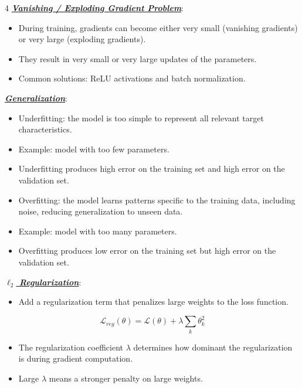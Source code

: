 \documentclass[12pt]{article}
\newcommand{\bulletPoint}[1]{\ul{\textit{\textbf{#1}}}}
\begin{document}
\begin{multicols*}{4}
\bulletPoint{Vanishing / Exploding Gradient Problem}:
\begin{itemize}
\item During training, gradients can become either very small (vanishing gradients) or very large (exploding gradients).
\item They result in very small or very large updates of the parameters.
\item Common solutions: ReLU activations and batch normalization.
\end{itemize}

\bulletPoint{Generalization}:
\begin{itemize}
\item Underfitting: the model is too simple to represent all relevant target characteristics.
\item Example: model with too few parameters.
\item Underfitting produces high error on the training set and high error on the validation set.
\item Overfitting: the model learns patterns specific to the training data, including noise, reducing generalization to unseen data.
\item Example: model with too many parameters.
\item Overfitting produces low error on the training set but high error on the validation set.
\end{itemize}

\bulletPoint{$\ell_2$ Regularization}:
\begin{itemize}
\item Add a regularization term that penalizes large weights to the loss function.
\end{itemize}
\useshortskip
\begin{equation*}
    \mathcal{L}_{reg}(\theta)=\mathcal{L}(\theta)+\lambda\sum_k \theta_k^2
\end{equation*}
\begin{itemize}
\item The regularization coefficient $\lambda$ determines how dominant the regularization is during gradient computation.
\item Large $\lambda$ means a stronger penalty on large weights.
\end{itemize}


\end{multicols*}
\end{document}
